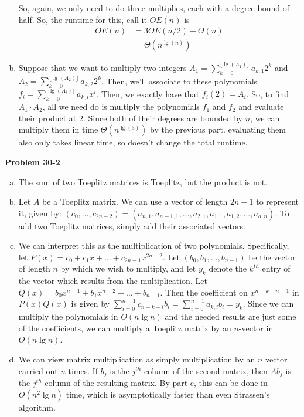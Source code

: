 \documentclass{article}
\begin{document}
\begin{enumerate}[a.]
So, again, we only need to do three multiplies, each with a degree bound of half. So, the runtime for this, call it $OE(n)$ is
\begin{align*}
OE(n) &= 3OE(n/2) + \Theta(n)\\
&= \Theta(n^{\lg(n)})
\end{align*}
\item
Suppose that we want to multiply two integers $A_1 = \sum_{k=0}^{\lfloor \lg(A_1) \rfloor}a_{k,1}2^k$ and $A_2 = \sum_{k=0}^{\lfloor \lg(A_2) \rfloor}a_{k,2}2^k$. Then, we'll associate to these polynomials $f_i = \sum_{k=0}^{\lfloor\lg(A_i)\rfloor} a_{k,i}x^i$. Then, we exactly have that $f_i(2) =A_i$. So, to find $A_1\cdot A_2$, all we need do is multiply the polynomials $f_1$ and $f_2$ and evaluate their product at $2$. Since both of their degrees are bounded by $n$, we can multiply them in time $\Theta(n^{\lg(3)})$ by the previous part. evaluating them also only takes linear time, so doesn't change the total runtime.
\end{enumerate}

\noindent\textbf{Problem 30-2}\\

\begin{enumerate}[a.]

\item The sum of two Toeplitz matrices is Toeplitz, but the product is not. \\

\item Let $A$ be a Toeplitz matrix.  We can use a vector of length $2n-1$ to represent it, given by: $(c_0, \ldots, c_{2n-2}) = (a_{n,1}, a_{n-1,1}, \ldots, a_{2,1}, a_{1,1}, a_{1,2}, \ldots, a_{a,n})$.  To add two Toeplitz matrices, simply add their associated vectors.

\item We can interpret this as the multiplication of two polynomials.  Specifically, let $P(x) = c_0 + c_1x + \ldots + c_{2n-1}x^{2n-2}$.  Let $(b_0,b_1,\ldots, b_{n-1})$ be the vector of length $n$ by which we wish to multiply, and let $y_k$ denote the $k^{th}$ entry of the vector which results from the multiplication.  Let $Q(x) = b_0x^{n-1} + b_1x^{n-2} + \ldots + b_{n-1}$.  Then the coefficient on $x^{n-k + n - 1}$ in $P(x)Q(x)$ is given by $\sum_{i=0}^{n-1} c_{n-k+i} b_i = \sum_{i=0}^{n-1}a_{k,i}b_i = y_k$.  Since we can multiply the polynomials in $O(n\lg n)$ and the needed results are just some of the coefficients, we can multiply a Toeplitz matrix by an $n$-vector in $O(n\lg n)$. 

\item We can view matrix multiplication as simply multiplication by an $n$ vector carried out $n$ times.  If $b_j$ is the $j^{th}$ column of the second matrix, then $Ab_j$ is the $j^{th}$ column of the resulting matrix.  By part c, this can be done in $O(n^2 \lg n)$ time, which is asymptotically faster than even Strassen's algorithm.
\end{enumerate}
\end{document}
